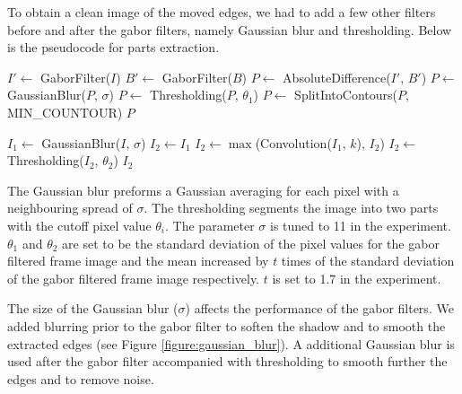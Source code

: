 \documentclass{article}
\begin{document}
To obtain a clean image of the moved edges, we had to add a few other filters before and after the gabor filters, namely Gaussian blur and thresholding. Below is the pseudocode for parts extraction.\\

\begin{algorithmic}[H]
		\State $I' \leftarrow$ GaborFilter($I$)
		\State $B' \leftarrow$ GaborFilter($B$)
		\State $P \leftarrow$ AbsoluteDifference($I'$, $B'$)
		\State $P \leftarrow$ GaussianBlur($P$, $\sigma$)
		\State $P \leftarrow$ Thresholding($P$, $\theta_1$)
		\State $P \leftarrow$ SplitIntoContours($P$, MIN\_COUNTOUR)
		\State \Return $P$
	\EndFunction 
\end{algorithmic}

\begin{algorithmic}[H]
		\State $I_1 \leftarrow$ GaussianBlur($I$, $\sigma$)
		\State $I_2 \leftarrow I_1$
			\State $I_2 \leftarrow \max$(Convolution($I_1$, $k$), $I_2$)
		\EndFor
		\State $I_2 \leftarrow$ Thresholding($I_2$, $\theta_2$)
		\State \Return $I_2$
	\EndFunction
	
\end{algorithmic}

The Gaussian blur preforms a Gaussian averaging for each pixel with a neighbouring spread of $\sigma$. The thresholding segments the image into two parts with the cutoff pixel value $\theta_i$. The parameter $\sigma$ is tuned to 11 in the experiment. $\theta_1$ and $\theta_2$ are set to be the standard deviation of the pixel values for the gabor filtered frame image and the mean increased by $t$ times of the standard deviation of the gabor filtered frame image respectively. $t$ is set to 1.7 in the experiment. 

The size of the Gaussian blur ($\sigma$) affects the performance of the gabor filters. We added blurring prior to the gabor filter to soften the shadow and to smooth the extracted edges (see Figure \ref{figure:gaussian_blur}). A additional Gaussian blur is used after the gabor filter accompanied with thresholding to smooth further the edges and to remove noise. 
\end{document}

